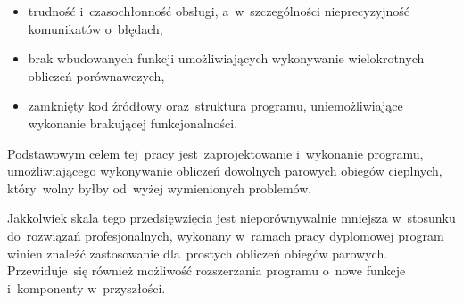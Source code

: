 \begin{itemize}

	\item trudność i~czasochłonność obsługi, a~w~szczególności
		nieprecyzyjność komunikatów o~błędach,

	\item brak wbudowanych funkcji umożliwiających wykonywanie
		wielokrotnych obliczeń porównawczych,

	\item zamknięty kod źródłowy oraz~struktura programu,
		uniemożliwiające wykonanie brakującej funkcjonalności.

\end{itemize}

Podstawowym celem tej~pracy jest~zaprojektowanie i~wykonanie
programu, umożliwiającego wykonywanie obliczeń dowolnych parowych
obiegów cieplnych, który~wolny byłby od~wyżej wymienionych problemów.

Jakkolwiek skala tego przedsięwzięcia jest nieporównywalnie mniejsza
w~stosunku do~rozwiązań profesjonalnych, wykonany w~ramach pracy
dyplomowej program winien znaleźć zastosowanie dla~prostych obliczeń
obiegów parowych. Przewiduje~się również możliwość rozszerzania programu
o~nowe funkcje i~komponenty w~przyszłości.
